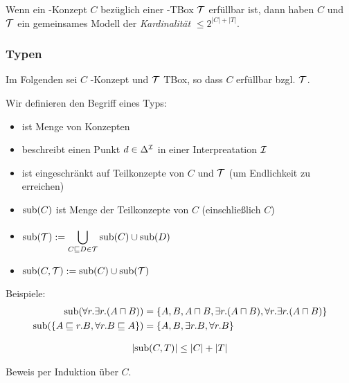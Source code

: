 \begin{theorem}
Wenn ein \ALC-Konzept $C$ bezüglich einer \ALC-TBox $\mathcal{T}$ erfüllbar ist, dann haben $C$ und $\mathcal{T}$ ein gemeinsames Modell der \emph{Kardinalität} $\leq 2^{|C|+|T|}$.
\end{theorem}

\subsubsection{Typen}
\label{sec:typ}

Im Folgenden sei $C$ \ALC-Konzept und $\mathcal{T}$ TBox, so dass $C$ erfüllbar bzgl. $\mathcal{T}$.

Wir definieren den Begriff eines Typs:

\begin{itemize}
  \item ist Menge von Konzepten
  \item beschreibt einen Punkt $d \in \Delta^{\mathcal{I}}$ in einer Interpreatation $\mathcal{I}$
  \item ist eingeschränkt auf Teilkonzepte von $C$ und $\mathcal{T}$ (um Endlichkeit zu erreichen)
\end{itemize}

\begin{definition}[Teilkonzepte]\mbox{}

\begin{itemize}
\item
  $\sub\left( C \right)$ ist Menge der Teilkonzepte von $C$
  (einschließlich $C$)
\item
  $\displaystyle \sub\left( \MT \right) := \bigcup_{C \sqsubseteq D \in \MT}^{}{\sub\left( C \right) \cup \sub\left( D \right)}$
\item
  $\sub\left( C,\MT \right) := \sub\left( C \right) \cup \sub\left( \MT \right)$
\end{itemize}
\end{definition}

\begin{tafel}
Beispiele:
\begin{align*}
    \operatorname{sub}(\forall r.\exists r.(A \sqcap B)) &= \{A,B,A \sqcap B, \exists r.(A \sqcap B), \forall r.\exists r.(A \sqcap B)\}\\
    \operatorname{sub}(\{A \sqsubseteq r.B, \forall r.B \sqsubseteq A\}) &= \{A,B, \exists r.B, \forall r.B\}
\end{align*}
\end{tafel}

\begin{lemma}
    \label{lem:num-sub}
    \begin{align*}
\left| \sub\left( C,T \right) \right| \leq \left| C \right| + \left| T \right|
\end{align*}
\end{lemma}
Beweis per Induktion über $C$.

